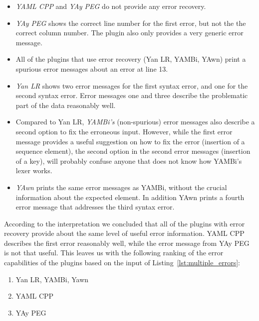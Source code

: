 \begin{itemize}

  \item \emph{YAML CPP} and \emph{YAy PEG} do not provide any error recovery.

  \item \emph{YAy PEG} shows the correct line number for the first error, but not the the correct column number. The plugin also only provides a very generic error message.

  \item All of the plugins that use error recovery (Yan LR, YAMBi, YAwn) print a spurious error messages about an error at line 13.

  \item \emph{Yan LR} shows two error messages for the first syntax error, and one for the second syntax error. Error messages one and three describe the problematic part of the  data reasonably well.

  \item Compared to Yan LR, \emph{YAMBi’s} (non-spurious) error messages also describe a second option to fix the erroneous input. However, while the first error message provides a useful suggestion on how to fix the error (insertion of a sequence element), the second option in the second error messages (insertion of a key), will probably confuse anyone that does not know how YAMBi’s lexer works.

  \item \emph{YAwn} prints the same error messages as YAMBi, without the crucial information about the expected element. In addition YAwn prints a fourth error message that addresses the third syntax error.

\end{itemize}

According to the interpretation we concluded that all of the plugins with error recovery provide about the same level of useful error information. YAML CPP describes the first error reasonably well, while the error message from YAy PEG is not that useful. This leaves us with the following ranking of the error capabilities of the plugins based on the input of Listing~\ref{lst:multiple_errors}:

\begin{enumerate}
  \item Yan LR, YAMBi, Yawn
  \item YAML CPP
  \item YAy PEG
\end{enumerate}

